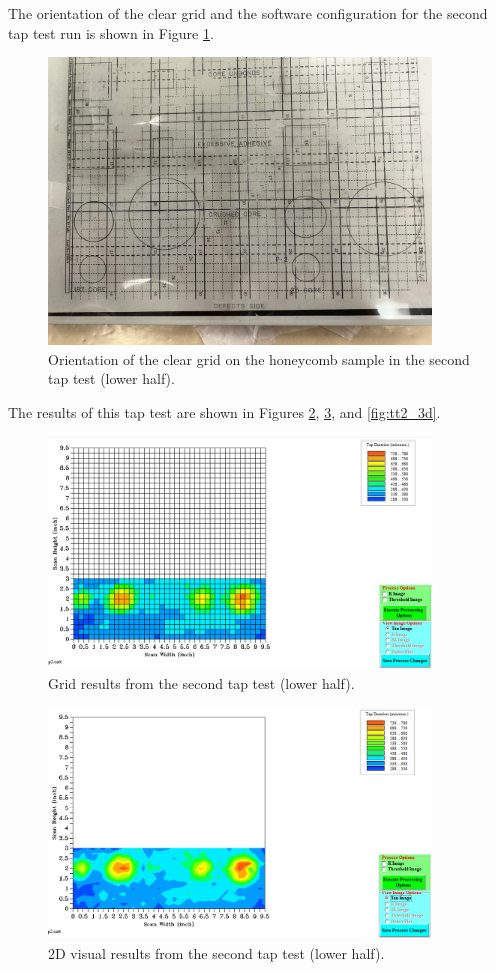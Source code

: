\documentclass[12 pt]{report}
\begin{document}
The orientation of the clear grid and the software configuration for the second tap test run is shown in Figure \ref{fig:tt2_orientation}.

\begin{figure}[htbp]
	\centering
	\includegraphics[width=4in]{images/graphs/tap testing/S4G2tap2-orientation}
	\caption{Orientation of the clear grid on the honeycomb sample in the second tap test (lower half).}
	\label{fig:tt2_orientation}
\end{figure}

The results of this tap test are shown in Figures \ref{fig:tt2_grid}, \ref{fig:tt2_2d}, and \ref{fig:tt2_3d}.

\begin{figure}[htbp]
	\centering
	\includegraphics[width=4in]{images/graphs/tap testing/S4G2tap2-grid}
	\caption{Grid results from the second tap test (lower half).}
	\label{fig:tt2_grid}
\end{figure}

\begin{figure}[htbp]
	\centering
	\includegraphics[width=4in]{images/graphs/tap testing/S4G2tap2-2D}
	\caption{2D visual results from the second tap test (lower half).}
	\label{fig:tt2_2d}
\end{figure}
\end{document}
